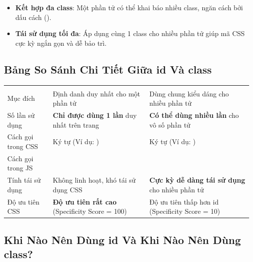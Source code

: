 \begin{tipBox}
\begin{itemize}[leftmargin=1.5em, itemsep=3pt, parsep=0pt]
    \item \textbf{Kết hợp đa class}: Một phần tử có thể khai báo nhiều class, ngăn cách bởi dấu cách ().
    \item \textbf{Tái sử dụng tối đa}: Áp dụng cùng 1 class cho nhiều phần tử giúp mã CSS cực kỳ ngắn gọn và dễ bảo trì.
\end{itemize}
\end{tipBox}

\subsection{Bảng So Sánh Chi Tiết Giữa id Và class}

\begin{prettyTableBox}
\begin{tabularx}{\linewidth}{K{2.5cm} Z Z}
 &  &  \\
Mục đích & Định danh duy nhất cho một phần tử & Dùng chung kiểu dáng cho nhiều phần tử \\
Số lần sử dụng & \textbf{Chỉ được dùng 1 lần} duy nhất trên trang & \textbf{Có thể dùng nhiều lần} cho vô số phần tử \\
Cách gọi trong CSS & Ký tự  (Ví dụ: ) & Ký tự  (Ví dụ: ) \\
Cách gọi trong JS & \small{} & \small{} \\
Tính tái sử dụng & Không linh hoạt, khó tái sử dụng CSS & \textbf{Cực kỳ dễ dàng tái sử dụng} cho nhiều phần tử \\
Độ ưu tiên CSS & \textbf{Độ ưu tiên rất cao} (Specificity Score = 100) & Độ ưu tiên thấp hơn id (Specificity Score = 10) \\
\end{tabularx}
\end{prettyTableBox}

\subsection{Khi Nào Nên Dùng id Và Khi Nào Nên Dùng class?}

